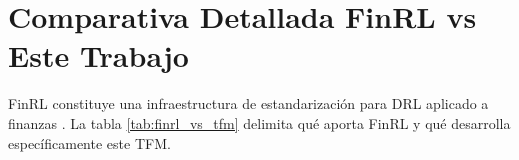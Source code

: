 \documentclass[IB,a4paper]{TFUOC}
\begin{document}

\newpage
\appendix

\chapter{Comparativa Detallada FinRL vs Este Trabajo}
\label{anx:finrl_comparison}

\noindent FinRL constituye una infraestructura de estandarización para DRL aplicado a finanzas \citep{liu2018finrl,liu2021finrl}. La tabla \ref{tab:finrl_vs_tfm} delimita qué aporta FinRL y qué desarrolla específicamente este TFM.
\end{document}
